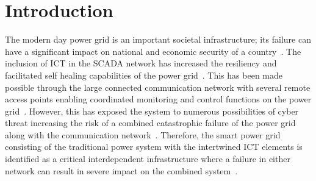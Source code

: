 \section{Introduction}\label{sec:intro}
The modern day power grid is an important societal infrastructure; its failure can have a significant impact on national and economic security of a country~\cite{NAP,ref1,raissa_2012}. The inclusion of ICT in the SCADA network has increased the resiliency and facilitated self healing capabilities of the power grid~\cite{alex2012}. This has been made possible through the large connected communication network with several remote access points enabling coordinated monitoring and control functions on the power grid~\cite{smart2005}. However, this has exposed the system to numerous possibilities of cyber threat increasing the risk of a combined catastrophic failure of the power grid along with the communication network~\cite{cigre2007}. Therefore, the smart power grid consisting of the traditional power system with the intertwined ICT elements is identified as a critical interdependent infrastructure where a failure in either network can result in severe impact on the combined system~\cite{stanley_2018}. 

